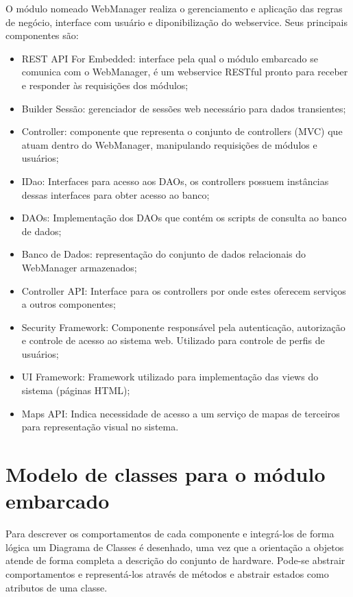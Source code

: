 O módulo nomeado WebManager realiza o gerenciamento e aplicação das regras de negócio, interface com usuário e diponibilização do webservice. Seus principais componentes são:

\begin{itemize}
	\item REST API For Embedded: interface pela qual o módulo embarcado se comunica com o WebManager, é um webservice RESTful pronto para receber e responder às requisições dos módulos;
	\item Builder Sessão: gerenciador de sessões web necessário para dados transientes;
	\item Controller: componente que representa o conjunto de controllers (MVC) que atuam dentro do WebManager, manipulando requisições de módulos e usuários;
	\item IDao: Interfaces para acesso aos DAOs, os controllers possuem instâncias dessas interfaces para obter acesso ao banco;
	\item DAOs: Implementação dos DAOs que contém os scripts de consulta ao banco de dados;
	\item Banco de Dados: representação do conjunto de dados relacionais do WebManager armazenados;
	\item Controller API: Interface para os controllers por onde estes oferecem serviços a outros componentes;
	\item Security Framework: Componente responsável pela autenticação, autorização e controle de acesso ao sistema web. Utilizado para controle de perfis de usuários;
	\item UI Framework: Framework utilizado para implementação das views do sistema (páginas HTML);
	\item Maps API: Indica necessidade de acesso a um serviço de mapas de terceiros para representação visual no sistema.
\end{itemize}

\section{Modelo de classes para o módulo embarcado}

Para descrever os comportamentos de cada componente e integrá-los de forma lógica um Diagrama de Classes
é desenhado, uma vez que a orientação a objetos atende de forma completa a descrição do conjunto de hardware.
Pode-se abstrair comportamentos e representá-los através de métodos e abstrair estados como atributos de uma classe. 

